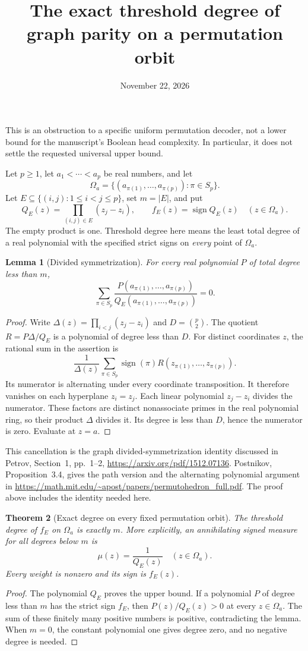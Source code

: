 \documentclass[11pt]{article}
\title{The exact threshold degree of graph parity on a permutation orbit}
\author{}
\date{November 22, 2026}
\newtheorem{theorem}{Theorem}
\newtheorem{lemma}[theorem]{Lemma}
\begin{document}
\maketitle

This is an obstruction to a specific uniform permutation decoder, not
a lower bound for the manuscript's Boolean head complexity. In particular,
it does not settle the requested universal upper bound.

Let $p\ge1$, let $a_1<\cdots<a_p$ be real numbers, and let
\[
 \Omega_a=\{(a_{\pi(1)},\ldots,a_{\pi(p)}):\pi\in S_p\}.
\]
Let $E\subseteq\{(i,j):1\le i<j\le p\}$, set $m=|E|$, and put
\[
 Q_E(z)=\prod_{(i,j)\in E}(z_j-z_i),\qquad
 f_E(z)=\operatorname{sign}Q_E(z)\quad(z\in\Omega_a).
\]
The empty product is one. Threshold degree here means the least total
degree of a real polynomial with the specified strict signs on
\emph{every} point of $\Omega_a$.

\begin{lemma}[Divided symmetrization]
For every real polynomial $P$ of total degree less than $m$,
\[
 \sum_{\pi\in S_p}\frac{P(a_{\pi(1)},\ldots,a_{\pi(p)})}
 {Q_E(a_{\pi(1)},\ldots,a_{\pi(p)})}=0.
\]
\end{lemma}
\begin{proof}
Write $\Delta(z)=\prod_{i<j}(z_j-z_i)$ and $D=\binom p2$.
The quotient $R=P\Delta/Q_E$ is a polynomial of degree less than $D$.
For distinct coordinates $z$, the rational sum in the assertion is
\[
 \frac{1}{\Delta(z)}
 \sum_{\pi\in S_p}\operatorname{sign}(\pi)
             R(z_{\pi(1)},\ldots,z_{\pi(p)}).
\]
Its numerator is alternating under every coordinate transposition.
It therefore vanishes on each hyperplane $z_i=z_j$. Each linear
polynomial $z_j-z_i$ divides the numerator. These factors are distinct
nonassociate primes in the real polynomial ring, so their product
$\Delta$ divides it. Its degree is less than $D$, hence the numerator
is zero. Evaluate at $z=a$.
\end{proof}

This cancellation is the graph divided-symmetrization identity discussed
in Petrov, Section~1, pp.~1--2,
\url{https://arxiv.org/pdf/1512.07136}.
Postnikov, Proposition~3.4, gives the path version and the alternating
polynomial argument in
\url{https://math.mit.edu/~apost/papers/permutohedron_full.pdf}.
The proof above includes the identity needed here.

\begin{theorem}[Exact degree on every fixed permutation orbit]
The threshold degree of $f_E$ on $\Omega_a$ is exactly $m$.
More explicitly, an annihilating signed measure for all degrees below
$m$ is
\[
 \mu(z)=\frac1{Q_E(z)}\quad(z\in\Omega_a).
\]
Every weight is nonzero and its sign is $f_E(z)$.
\end{theorem}
\begin{proof}
The polynomial $Q_E$ proves the upper bound. If a polynomial $P$ of
degree less than $m$ has the strict sign $f_E$, then $P(z)/Q_E(z)>0$
at every $z\in\Omega_a$. The sum of these finitely many positive
numbers is positive, contradicting the lemma. When $m=0$, the constant
polynomial one gives degree zero, and no negative degree is needed.
\end{proof}
\end{document}
